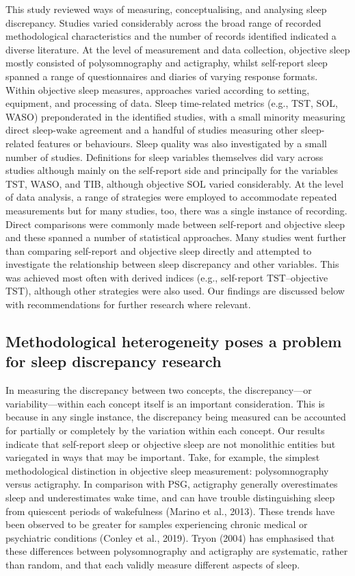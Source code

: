 \documentclass[
]{article}
\begin{document}
This study reviewed ways of measuring, conceptualising, and analysing sleep discrepancy. Studies varied considerably across the broad range of recorded methodological characteristics and the number of records identified indicated a diverse literature. At the level of measurement and data collection, objective sleep mostly consisted of polysomnography and actigraphy, whilst self-report sleep spanned a range of questionnaires and diaries of varying response formats. Within objective sleep measures, approaches varied according to setting, equipment, and processing of data. Sleep time-related metrics (e.g., TST, SOL, WASO) preponderated in the identified studies, with a small minority measuring direct sleep-wake agreement and a handful of studies measuring other sleep-related features or behaviours. Sleep quality was also investigated by a small number of studies. Definitions for sleep variables themselves did vary across studies although mainly on the self-report side and principally for the variables TST, WASO, and TIB, although objective SOL varied considerably. At the level of data analysis, a range of strategies were employed to accommodate repeated measurements but for many studies, too, there was a single instance of recording. Direct comparisons were commonly made between self-report and objective sleep and these spanned a number of statistical approaches. Many studies went further than comparing self-report and objective sleep directly and attempted to investigate the relationship between sleep discrepancy and other variables. This was achieved most often with derived indices (e.g., self-report TST--objective TST), although other strategies were also used. Our findings are discussed below with recommendations for further research where relevant.

\subsection{Methodological heterogeneity poses a problem for sleep discrepancy research}\label{methodological-heterogeneity-poses-a-problem-for-sleep-discrepancy-research}

In measuring the discrepancy between two concepts, the discrepancy---or variability---within each concept itself is an important consideration. This is because in any single instance, the discrepancy being measured can be accounted for partially or completely by the variation within each concept. Our results indicate that self-report sleep or objective sleep are not monolithic entities but variegated in ways that may be important. Take, for example, the simplest methodological distinction in objective sleep measurement: polysomnography versus actigraphy. In comparison with PSG, actigraphy generally overestimates sleep and underestimates wake time, and can have trouble distinguishing sleep from quiescent periods of wakefulness (Marino et al., 2013). These trends have been observed to be greater for samples experiencing chronic medical or psychiatric conditions (Conley et al., 2019). Tryon (2004) has emphasised that these differences between polysomnography and actigraphy are systematic, rather than random, and that each validly measure different aspects of sleep.
\end{document}
